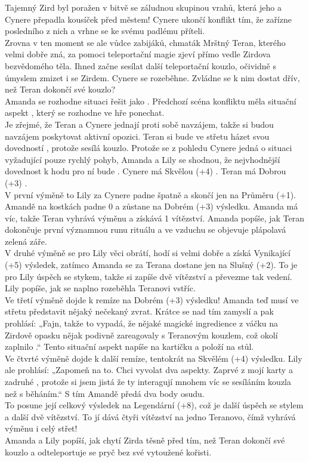 \documentclass[../main.tex]{subfiles}
\begin{document}
Tajemný Zird byl poražen v bitvě se záludnou skupinou vrahů, která jeho a Cynere přepadla kousíček před městem! Cynere ukončí konflikt tím, že zařízne posledního z nich a vrhne se ke svému padlému příteli. \\
Zrovna v ten moment se ale vůdce zabijáků, chmaták Mrštný Teran, kterého velmi dobře zná, za pomoci teleportační magie zjeví přímo vedle Zirdova bezvědomého těla. Ihned začne sesílat další teleportační kouzlo, očividně s úmyslem zmizet i se Zirdem. Cynere se rozeběhne. Zvládne se k nim dostat dřív, než Teran dokončí své kouzlo?\\
Amanda se rozhodne situaci řešit jako . Předchozí scéna konfliktu měla situační aspekt , který se rozhodne ve hře ponechat.\\
Je zřejmé, že Teran a Cynere jednají proti sobě navzájem, takže si budou navzájem poskytovat aktivní opozici. Teran si bude ve střetu házet svou dovedností , protože sesílá kouzlo. Protože se z pohledu Cynere jedná o situaci vyžadující pouze rychlý pohyb, Amanda a Lily se shodnou, že nejvhodnější dovednost k hodu pro ní bude .
Cynere má Skvělou (+4) . Teran má Dobrou (+3) .\\
V první výměně to Lily za Cynere padne špatně a skončí jen na Průměru (+1). Amandě na kostkách padne 0 a zůstane na Dobrém (+3) výsledku. Amanda má víc, takže Teran vyhrává výměnu a získává 1 vítězství. Amanda popíše, jak Teran dokončuje první významnou runu rituálu a ve vzduchu se objevuje plápolavá zelená záře.\\
V druhé výměně se pro Lily věci obrátí, hodí si velmi dobře a získá Vynikající (+5) výsledek, zatímco Amanda se za Terana dostane jen na Slušný (+2). To je pro Lily úspěch se stykem, takže si zapíše dvě vítězství a převezme tak vedení. Lily popíše, jak se naplno rozeběhla Teranovi vstříc.\\
Ve třetí výměně dojde k remíze na Dobrém (+3) výsledku! Amanda teď musí ve střetu představit nějaký nečekaný zvrat. Krátce se nad tím zamyslí a pak prohlásí: „Fajn, takže to vypadá, že nějaké magické ingredience z váčku na Zirdově opasku nějak podivně zareagovaly s Teranovým kouzlem, což okolí zaplnilo .“ Tento situační aspekt napíše na kartičku a položí na stůl. \\
Ve čtvrté výměně dojde k další remíze, tentokrát na Skvělém (+4) výsledku. Lily ale prohlásí: „Zapomeň na to. Chci vyvolat dva aspekty. Zaprvé  z mojí karty a zadruhé , protože si jsem jistá že ty interagují mnohem víc se sesíláním kouzla než s běháním.“ S tím Amandě předá dva body osudu.\\
To posune její celkový výsledek na Legendární (+8), což je další úspěch se stylem a další dvě vítězství. To jí dává čtyři vítězství na jedno Teranovo, čímž vyhrává výměnu i celý střet!\\
Amanda a Lily popíší, jak chytí Zirda těsně před tím, než Teran dokončí své kouzlo a odteleportuje se pryč bez své vytoužené kořisti.
\end{document}
